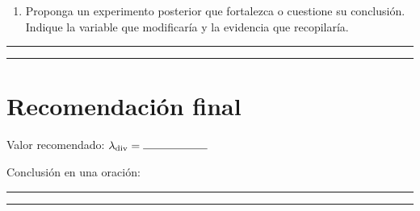 \documentclass[11pt,letterpaper]{article}
\newcommand{\answerbox}[1]{%
  \par\noindent\textcolor{gray}{\rule{\linewidth}{0.4pt}}%
  \vspace{#1}\par\noindent\textcolor{gray}{\rule{\linewidth}{0.4pt}}%
}
\begin{document}
\begin{enumerate}[resume]
  \item Proponga un experimento posterior que fortalezca o cuestione su
  conclusión. Indique la variable que modificaría y la evidencia que recopilaría.
\end{enumerate}
\answerbox{2.8cm}

\section*{Recomendación final}

Valor recomendado: $\lambda_{\mathrm{div}}=\rule{2cm}{0.4pt}$

Conclusión en una oración:
\answerbox{1.8cm}
\end{document}
